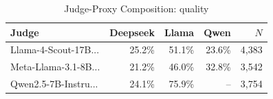 \begin{table}[htbp]
\centering
\caption{Judge-Proxy Composition: quality}
\label{tab:composition_quality}
\begin{tabular}{lrrrr}
\toprule
Judge & Deepseek & Llama & Qwen & $N$ \\
\midrule
Llama-4-Scout-17B... & 25.2\% & 51.1\% & 23.6\% & 4,383 \\
Meta-Llama-3.1-8B... & 21.2\% & 46.0\% & 32.8\% & 3,542 \\
Qwen2.5-7B-Instru... & 24.1\% & 75.9\% & -- & 3,754 \\
\bottomrule
\end{tabular}
\end{table}